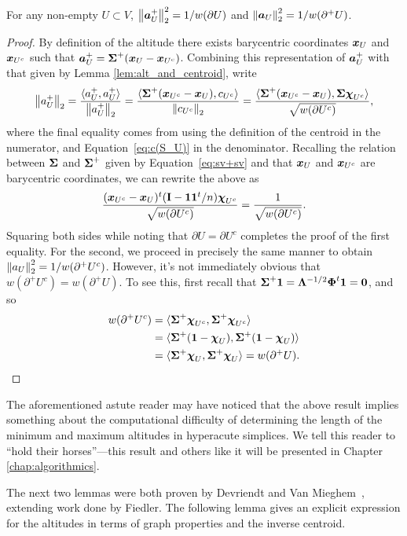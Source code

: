 \begin{lemma}
\label{lem:||alt||}
For any non-empty $U\subset V$, $\norm{\vb*{a}^+_U}_2^2=1/w(\partial U)$ and $\norm{\vb*{a}_U}_2^2 = 1/w(\partial^+ U)$.  
\end{lemma}
\begin{proof}
By definition of the altitude there exists barycentric coordinates $\vb*{x}_U$ and $\vb*{x}_{U^c}$ such that $\vb*{a}^+_U = \boldsymbol{\Sigma}^+(\vb*{x}_U-\vb*{x}_{U^c})$. Combining this representation of $\vb*{a}^+_U$ with that given by Lemma \ref{lem:alt_and_centroid}, write 
\begin{align*}
    \norm{a^+_U}_2 = \frac{\langle a^+_U,a^+_U\rangle }{\norm{a^+_U}_2} = \frac{\langle \boldsymbol{\Sigma}^+(\vb*{x}_{U^c}-\vb*{x}_{U}), c_{U^c}\rangle }{\norm{c_{U^c}}_2} = \frac{\langle \boldsymbol{\Sigma}^+(\vb*{x}_{U^c}-\vb*{x}_{U}), \boldsymbol{\Sigma}\boldsymbol{\chi}_{U^c}\rangle }{\sqrt{w(\partial U^c)}},
\end{align*}
where the final equality comes from using the definition of the centroid in the numerator, and Equation~\eqref{eq:c(S_U)} in the denominator. Recalling the relation between $\boldsymbol{\Sigma}$ and $\boldsymbol{\Sigma}^+$ given by Equation~\eqref{eq:sv+sv} and that $\vb*{x}_U$ and $\vb*{x}_{U^c}$ are barycentric coordinates, we can rewrite the above as 
\[\frac{(\vb*{x}_{U^c}-\vb*{x}_{U})^t(\vb{I}-\vb{1}\vb{1}^t/n)\boldsymbol{\chi}_{U^c}}{\sqrt{w(\partial U^c)}}=\frac{1}{\sqrt{w(\partial U^c)}}. \]
Squaring both sides while noting that $\partial U = \partial U^c$ completes the proof of the first equality. For the second, we proceed in precisely the same manner to obtain $\norm{a_U}_2^2 = 1/w(\partial^+ U^c)$. However, it's not immediately obvious that $w(\partial^+U^c)=w(\partial^+U)$. To see this, first recall that $\boldsymbol{\Sigma}^+\vb{1} = \vb{\Lambda}^{-1/2}\boldsymbol{\Phi}^t\vb{1} = \vb{0}$, and so 
\begin{align*}
w(\partial^+ U^c) &= \langle \boldsymbol{\Sigma}^+\boldsymbol{\chi}_{U^c},\boldsymbol{\Sigma}^+\boldsymbol{\chi}_{U^c}\rangle  \\
&= \langle \boldsymbol{\Sigma}^+(\vb{1} - \boldsymbol{\chi}_{U}),\boldsymbol{\Sigma}^+(\vb{1} - \boldsymbol{\chi}_{U})\rangle  \\
&= \langle \boldsymbol{\Sigma}^+\boldsymbol{\chi}_{U},\boldsymbol{\Sigma}^+\boldsymbol{\chi}_{U}\rangle = w(\partial^+ U).
\qedhere
\end{align*}
\end{proof}

The aforementioned astute reader may have noticed that the above result implies something about the computational difficulty of determining the length of the minimum and maximum altitudes in hyperacute simplices. We tell this reader to ``hold their horses''---this result and others like it will be presented in Chapter \ref{chap:algorithmics}. 

The next two lemmas were both proven by Devriendt and Van Mieghem~\cite{devriendt2018simplex}, extending work done by Fiedler. 
The following lemma gives an explicit expression for the altitudes in terms of graph properties and the inverse centroid. 

